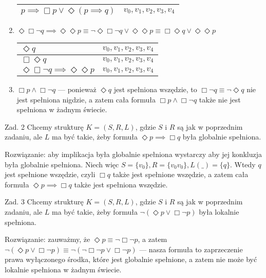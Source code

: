 \documentclass[11pt]{article}
\begin{document}
\begin{enumerate}[label=(\alph*)]
\begin{tabular}{ | l | l | }
			$p \implies \Box p \lor \Diamond (p \implies q)$ & $v_0, v_1, v_2, v_3, v_4$ \\\hline
		\end{tabular}
		\item $\Diamond\Box\neg q \implies \Diamond\Diamond p \equiv \neg\Diamond\Box\neg q \lor \Diamond\Diamond p \equiv \Box\Diamond q \lor \Diamond\Diamond p$ \\
		\begin{tabular}{ | l | l | }
			\hline
			$\Diamond q$ & $v_0, v_1, v_2, v_3, v_4$ \\\hline
			$\Box\Diamond q$ & $v_0, v_1, v_2, v_3, v_4$ \\\hline
			$\Diamond\Box\neg q \implies \Diamond\Diamond p$ & $v_0, v_1, v_2, v_3, v_4$ \\\hline
		\end{tabular}
		\item $\Box p \land \Box\neg q$ — ponieważ $\Diamond q$ jest spełniona wszędzie, to $\Box\neg q \equiv \neg\Diamond q$ nie jest spełniona nigdzie, a zatem cała formuła $\Box p \land \Box\neg q$ także nie jest spełniona w żadnym świecie.
	\end{enumerate}
	
	\newpage
	
	\par Zad. 2 Chcemy strukturę $K = (S, R, L)$, gdzie $S$ i $R$ są jak w poprzednim zadaniu, ale $L$ ma być takie, żeby formuła $\Diamond p \implies \Box q$ była globalnie spełniona.
	\par Rozwiązanie: aby implikacja była globalnie spełniona wystarczy aby jej konkluzja była globalnie spełniona. Niech więc $S= \{v_0\}, R = \{v_0 v_0\}, L(\_) = \{q\}$. Wtedy $q$ jest spełnione wszędzie, czyli $\Box q$ także jest spełnione wszędzie, a zatem cała formuła $\Diamond p \implies \Box q$ także jest spełniona wszędzie. \\

	\par Zad. 3 Chcemy strukturę $K = (S, R, L)$, gdzie $S$ i $R$ są jak w poprzednim zadaniu, ale $L$ ma być takie, żeby formuła $\neg (\Diamond p \lor \Box\neg p)$ była lokalnie spełniona.
	\par Rozwiązanie: zauważmy, że $\Diamond p \equiv \neg\Box\neg p$, a zatem $\neg (\Diamond p \lor \Box\neg p) \equiv \neg (\neg\Box\neg p \lor \Box\neg p)$ — nasza formuła to zaprzeczenie prawa wyłączonego środka, które jest globalnie spełnione, a zatem nie może być lokalnie spełniona w żadnym świecie. \\
	
\end{document}
